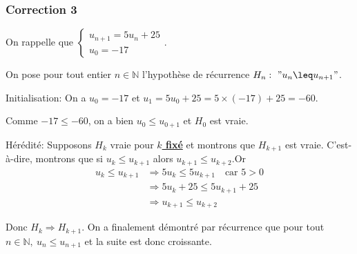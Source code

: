\documentclass[15pt, mathserif]{beamer}
\begin{document}
\begin{frame}
\vspace{-10mm}
	\frametitle{Correction 3}
\vspace{6.5mm}

On rappelle que $\begin{cases} u_{n+1} = 5u_n+25\\ u_0 = -17\end{cases}$.

\medskip

 On pose pour tout entier $n \in \mathbb{N}$ l'hypothèse de récurrence $H_n:~"u_n  \leq u_{n+1}"$.

\medskip

Initialisation: On a $u_0 =-17$ et $u_1 = 5u_0+25= 5\times\left(-17\right)+25=-60$.

 Comme $-17 \leq -60$, on a bien $u_0  \leq u_{0+1}$ et $H_0$ est vraie.

\medskip

Hérédité: Supposons $H_k$ vraie pour \textbf\underline{{$k$ fixé}} et montrons que $H_{k+1}$ est vraie. C'est-à-dire, montrons que si $u_k  \leq u_{k+1}$ alors $u_{k+1}  \leq u_{k+2}$.Or \begin{align*} u_k  \leq u_{k+1} &\Rightarrow 5u_k \leq 5u_{k+1}\quad \text{car } 5>0\\
	 &\Rightarrow5u_k+25 \leq 5u_{k+1}+25\\
	 &\Rightarrow u_{k+1}  \leq u_{k+2}
\end{align*}

Donc $H_{k} \Rightarrow H_{k+1}$. On a finalement démontré par récurrence que pour tout $n \in\mathbb{N},~ u_n \leq u_{n+1}$ et la suite est donc croissante.\end{frame}
\end{document}
